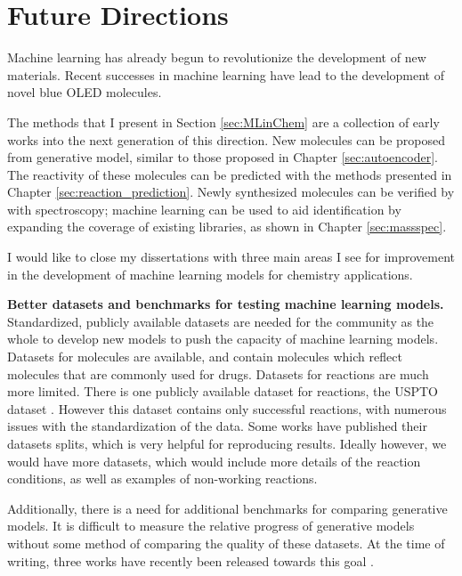 \chapter{Future Directions}\label{ch:future_directions}
\dsp

Machine learning has already begun to revolutionize the development of new materials.
Recent successes in machine learning have lead to the development of novel blue OLED molecules\cite{bombarelli2016}.

The methods that I present in Section \ref{sec:MLinChem} are a collection of early works into the next generation of this direction.
New molecules can be proposed from generative model, similar to those proposed in Chapter \ref{sec:autoencoder}.
The reactivity of these molecules can be predicted with the methods presented in Chapter \ref{sec:reaction_prediction}.
Newly synthesized molecules can be verified by with spectroscopy;
 machine learning can be used to aid identification by expanding the coverage of existing libraries, as shown
 in Chapter \ref{sec:massspec}.


I would like to close my dissertations with three main areas I see for improvement in the development of machine learning models for chemistry applications.

\textbf{Better datasets and benchmarks for testing machine learning models.}
Standardized, publicly available datasets are needed for the community as the whole to develop new models to push the capacity of machine learning models.
Datasets for molecules are available, and contain molecules which reflect molecules that are commonly used for drugs.
Datasets for reactions are much more limited. There is one publicly available dataset for reactions, the USPTO dataset \cite{lowe2012extraction}.
However this dataset contains only successful reactions, with numerous issues with the standardization of the data.
Some works have published their datasets splits, which is very helpful for reproducing results.
Ideally however, we would have more datasets, which would include more details of the reaction conditions, as well as examples of non-working reactions.

Additionally, there is a need for additional benchmarks for comparing generative models.
It is difficult to measure the relative progress of generative models without some method of comparing the quality of these datasets.
At the time of writing, three works have recently been released towards this goal \cite{Polykovskiy2018MolecularSets,Preuer2018Frechet,brown2018guacamol}.


